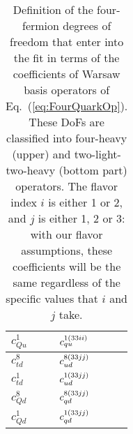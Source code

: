 \begin{table}[htbp]
\begin{center}
\begin{tabular}{ll}
    $c_{Qu}^{1}$     &  $  \ccc{1}{qu}{33ii}$  \\     \hline
    $c_{td}^{8}$        &   $\ccc{8}{ud}{33jj}$ \\    \hline
    $c_{td}^{1}$          &  $ \ccc{1}{ud}{33jj}$ \\     \hline
    $c_{Qd}^{8}$        &   $ \ccc{8}{qd}{33jj}$ \\     \hline
    $c_{Qd}^{1}$         &   $ \ccc{1}{qd}{33jj}$\\
         \bottomrule
  \end{tabular}
  \caption{\small Definition of the four-fermion degrees of freedom that enter into
    the fit in terms of the coefficients of Warsaw basis operators of Eq.~(\ref{eq:FourQuarkOp}).
    These DoFs are classified into four-heavy (upper) and two-light-two-heavy
    (bottom part) operators. The flavor index $i$ is either 1 or 2, 
    and $j$ is either 1, 2 or 3: with our flavor assumptions,  these coefficients will be the same
    regardless of the specific values that $i$ and $j$ take.
\label{eq:summaryOperatorsTop}}
  \end{center}
\end{table}


